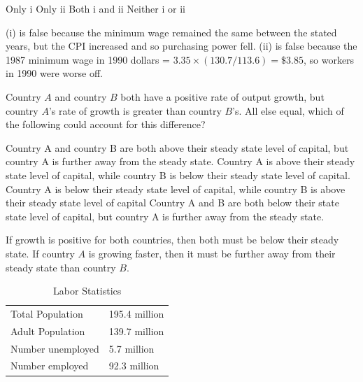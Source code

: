 \documentclass[addpoints,11pt]{exam}
\theoremstyle{definition}
\begin{document}
\begin{questions}
	\begin{choices}
		\choice Only i
		\choice Only ii
		\choice Both i and ii 
		\CorrectChoice Neither i or ii
	\end{choices}	
	
	\begin{solution} 
		(i) is false because the minimum wage remained the same between the stated years, but the CPI increased and so purchasing power fell. (ii) is false because the 1987 minimum wage in 1990 dollars = $3.35\times(130.7/113.6) = \$3.85$, so workers in 1990 were worse off.
	\end{solution}
	
	\question Country $A$ and country $B$ both have a positive rate of output growth, but country $A$'s rate of growth is greater than country $B$'s. All else equal, which of the following could account for this difference?
	
	\begin{choices}
		\choice Country A and country B are both above their steady state level of capital, but country A is further away from the steady state.
		\choice Country A is above their steady state level of capital, while country B is below their steady state level of capital.
		\choice Country A is below their steady state level of capital, while country B is above their steady state level of capital
		\CorrectChoice Country A and B are both below their state state level of capital, but country A is further away from the steady state.
	\end{choices}
	
	\begin{solution} 
		If growth is positive for both countries, then both must be below their steady state. If country $A$ is growing faster, then it must be further away from their steady state than country $B$.
	\end{solution}



\begin{table}[H]
	\centering
	\caption{Labor Statistics}
	\label{tab4}
	\begin{tabular}{ll}        
		
		
		Total Population & 195.4 million \\
		Adult Population & 139.7 million \\
		Number unemployed & 5.7 million \\
		Number employed & 92.3 million \\
		

\end{tabular}
\end{table}
\end{questions}
\end{document}
